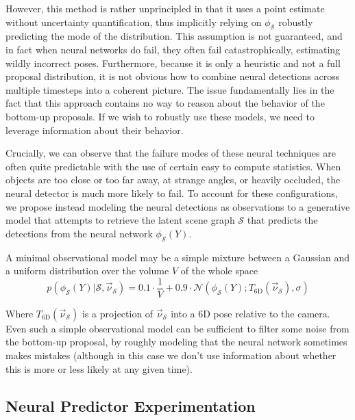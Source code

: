     However, this method is rather unprincipled in that it uses a point
    estimate without uncertainty quantification, thus implicitly relying on
    $\phi_\mathcal{S}$ robustly predicting the mode of the distribution. This
    assumption is not guaranteed, and in fact when neural networks do fail,
    they often fail catastrophically, estimating wildly incorrect poses.
    Furthermore, because it is only a heuristic and not a full proposal
    distribution, it is not obvious how to combine neural detections across
    multiple timesteps into a coherent picture.  The issue fundamentally lies
    in the fact that this approach contains no way to reason about the behavior
    of the bottom-up proposals.  If we wish to robustly use these models, we
    need to leverage information about their behavior.

    Crucially, we can observe that the failure modes of these neural techniques
    are often quite predictable with the use of certain easy to compute
    statistics. When objects are too close or too far away, at strange angles,
    or heavily occluded, the neural detector is much more likely to fail. To
    account for these configurations, we propose instead modeling the neural
    detections as observations to a generative model that attempts to retrieve
    the latent scene graph $\mathcal{S}$ that predicts the detections from the
    neural network $\phi_\mathcal{S}(Y)$.

    A minimal observational model may be a simple mixture between a Gaussian
    and a uniform distribution over the volume $V$ of the whole space
    \begin{equation} \label{eq:1.2}
      p(\phi_\mathcal{S}(Y) | \mathcal{S}, \vec{\nu}_\mathcal{S}) = 0.1 \cdot \frac{1}{V} + 0.9 \cdot \mathcal{N}(\phi_\mathcal{S}(Y); T_\mathrm{6D}(\vec{\nu}_\mathcal{S}), \sigma)
    \end{equation}

    Where $T_\mathrm{6D}(\vec{\nu}_\mathcal{S})$ is a projection of
    $\vec{\nu}_\mathcal{S}$ into a 6D pose relative to the camera. Even such a
    simple observational model can be sufficient to filter some noise from the
    bottom-up proposal, by roughly modeling that the neural network sometimes
    makes mistakes (although in this case we don't use information about
    whether this is more or less likely at any given time).

  \subsection{Neural Predictor Experimentation}

